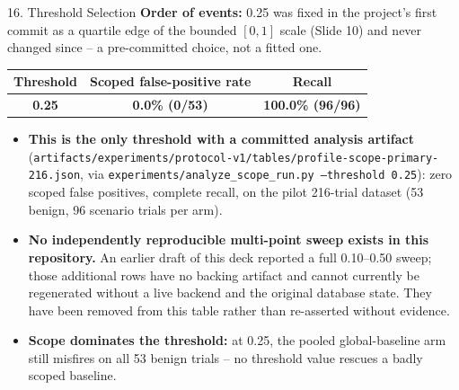 \documentclass[aspectratio=169, 11pt]{beamer}
\renewcommand{\arraystretch}{1.15}
\begin{document}
\begin{frame}{16. Threshold Selection}
    \scriptsize
    \textbf{Order of events:} 0.25 was fixed in the project's first commit as a quartile edge of the bounded $[0,1]$ scale (Slide 10) and never changed since -- a pre-committed choice, not a fitted one.
    \vspace{0.06cm}
    \begin{center}
    \renewcommand{\arraystretch}{0.85}
    \begin{tabular}{ccc}
        \toprule
        \textbf{Threshold} & \textbf{Scoped false-positive rate} & \textbf{Recall} \\
        \midrule
        \textbf{0.25} & \textbf{0.0\% (0/53)} & \textbf{100.0\% (96/96)} \\
        \bottomrule
    \end{tabular}
    \end{center}
    \vspace{0.04cm}
    \begin{itemize}\setlength\itemsep{1pt}
        \item \textbf{This is the only threshold with a committed analysis artifact}
        (\texttt{artifacts/experiments/protocol-v1/tables/profile-scope-primary-216.json},
        via \texttt{experiments/analyze\_scope\_run.py --threshold 0.25}): zero scoped
        false positives, complete recall, on the pilot 216-trial dataset (53 benign, 96
        scenario trials per arm).
        \item \textbf{No independently reproducible multi-point sweep exists in this
        repository.} An earlier draft of this deck reported a full 0.10--0.50 sweep;
        those additional rows have no backing artifact and cannot currently be
        regenerated without a live backend and the original database state. They have
        been removed from this table rather than re-asserted without evidence.
        \item \textbf{Scope dominates the threshold:} at 0.25, the pooled
        global-baseline arm still misfires on all 53 benign trials -- no threshold
        value rescues a badly scoped baseline.
    \end{itemize}
\end{frame}
\end{document}
